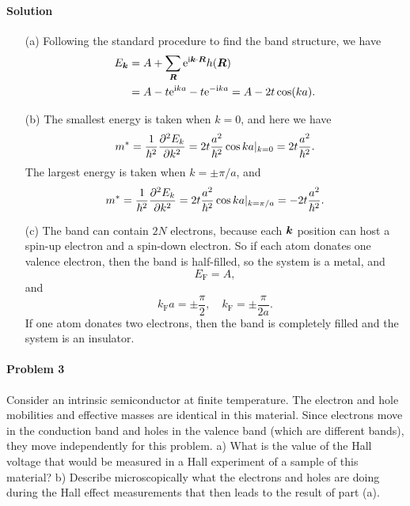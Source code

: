 \documentclass[hyperref, a4paper]{article}
\newcommand*{\ii}{\mathrm{i}}
\newcommand*{\ee}{\mathrm{e}}
\begin{document}
\paragraph{Solution} \begin{itemize}
\item[(a)] Following the standard procedure to find the band structure, we have 
\begin{equation}
    \begin{aligned}
        E_{\vb*{k}} &= A + \sum_{\vb*{R}} \ee^{\ii \vb*{k} \cdot \vb*{R}} h(\vb*{R}) \\
        &= A - t \ee^{\ii k a} - t \ee^{- \ii k a} = A - 2 t \cos(ka).
    \end{aligned}
\end{equation}
\item[(b)] The smallest energy is taken when $k = 0$,
and here we have 
\begin{equation}
    m^* = \frac{1}{\hbar^2} \pdv[2]{E_k}{k} = 2 t \frac{a^2}{\hbar^2} \cos ka |_{k = 0} = 2 t \frac{a^2}{\hbar^2}.
\end{equation}
The largest energy is taken when $k = \pm \pi / a$,
and 
\begin{equation}
    m^* = \frac{1}{\hbar^2} \pdv[2]{E_k}{k} = 2 t \frac{a^2}{\hbar^2} \cos ka |_{k = \pi / a} = - 2 t \frac{a^2}{\hbar^2}.
\end{equation}

\item[(c)] The band can contain $2N$ electrons,
because each $\vb*{k}$ position can host a spin-up electron and a spin-down electron.
So if each atom donates one valence electron,
then the band is half-filled,
so the system is a metal, and
\begin{equation}
    E_\text{F} = A,
\end{equation}
and 
\begin{equation}
    k_{\text{F}} a = \pm \frac{\pi}{2}, \quad k_{\text{F}} = \pm \frac{\pi}{2a}.
\end{equation}
If one atom donates two electrons,
then the band is completely filled and the system is an insulator.

\end{itemize}

\paragraph{Problem 3} Consider an intrinsic semiconductor at finite temperature. The electron and hole mobilities and effective masses are identical in this material. Since electrons move in the conduction band and holes in the valence band (which are different bands), they move independently for this problem.
a) What is the value of the Hall voltage that would be measured in a Hall experiment of a sample of this material?
b) Describe microscopically what the electrons and holes are doing during the Hall effect measurements that then leads to the result of part (a).
\end{document}
